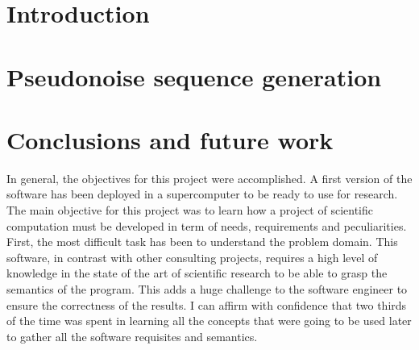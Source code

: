 \documentclass{tfg_domingo}
\begin{document}

\portada
\frontmatter
\gracias{}
\resumen{}{}
\tableofcontents

\mainmatter


\chapter{Introduction}
  

\chapter{Pseudonoise sequence generation}
  








\chapter{Conclusions and future work}

  In general, the objectives for this project were accomplished. A first version
  of the software has been deployed in a supercomputer to be ready to use for
  research. The main objective  for this project was to learn how a project of
  scientific computation must be developed in term of  needs, requirements and
  peculiarities.\\

  First, the most difficult task has been to understand
  the problem domain. This software, in contrast with other consulting
  projects, requires a high level of knowledge in the state of the art of
  scientific research to be able to grasp the semantics of the program. This adds a
  huge challenge to the software engineer to ensure the correctness of the results.
  I can affirm with confidence that two thirds of the time was spent in learning
  all the concepts that were going to be used later to gather all the software
  requisites and semantics.\\
\end{document}
